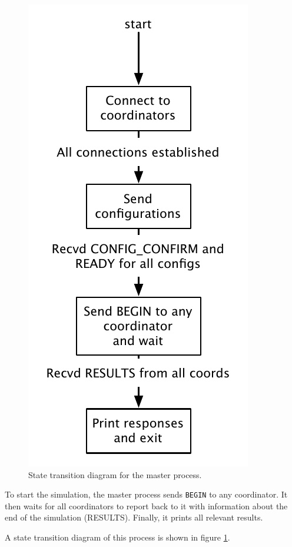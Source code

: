 \begin{figure}
    \begin{center}
        \includegraphics[scale=0.5]{figures/state_master.pdf}
    \end{center}
    \caption{State transition diagram for the master process.}
    \label{master}
\end{figure}

To start the simulation, the master process sends \texttt{BEGIN} to any coordinator. It then waits for all coordinators to report back to it with information about the end of the simulation (RESULTS). Finally, it prints all relevant results.

A state transition diagram of this process is shown in figure \ref{master}.

